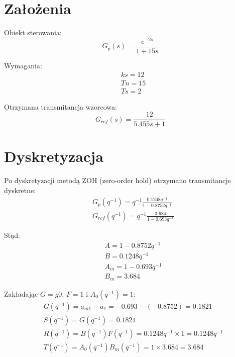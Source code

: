 \documentclass[fleqn]{article}
\newcommand \A {1 - 0.8752 q^{-1}}
\newcommand \B {0.1248 q^{-1}}
\newcommand \Am {1 - 0.693 q^{-1}}
\newcommand \Bm {3.684}
\newcommand \aOne {-0.8752}
\newcommand \amOne {-0.693}
\begin{document}
  
\section{Założenia}

Obiekt sterowania:
\begin{equation}\label{eq:Gp}
G_p(s) = \frac{e^{-2s}}{1 + 15s}
\end{equation}

Wymagania:
\begin{equation}\label{eq:wymagania}
\begin{split}
& ks = 12 \\
& Tn = 15 \\
& Ts = 2
\end{split}
\end{equation}

Otrzymana transmitancja wzorcowa:
\begin{equation}\label{eq:tr_ref}
G_{ref}(s) = \frac{12}{5.455s + 1}
\end{equation}

\section{Dyskretyzacja}
Po dyskretyzacji metodą ZOH (zero-order hold) otrzymano transmitancje dyskretne:
\begin{equation}\label{eq:G_d}
\begin{split}
& G_p(q^{-1}) = q^{-1}\frac{\B}{\A} \\
& G_{ref}(q^{-1}) = q^{-1}\frac{\Bm}{\Am}
\end{split}
\end{equation} %

Stąd:
\begin{equation}\label{eq:A_B_m}
\begin{split}
& A = \A \\
& B = \B \\
& A_m = \Am \\
& B_m = \Bm
\end{split}
\end{equation}

Zakładając $G = g0$, $F=1$ i $A_0(q^{-1})=1$:
\begin{equation}\label{eq:polynomials}
\begin{split}
& G(q^{-1}) = a_{m1} - a_1 = \amOne - (\aOne) = 0.1821 \\
& S(q^{-1}) = G(q^{-1}) = 0.1821 \\
& R(q^{-1}) = B(q^{-1})F(q^{-1}) = \B \times 1 = \B \\
& T(q^{-1}) = A_0(q^{-1})B_m(q^{-1}) = 1 \times \Bm = \Bm \\
\end{split}
\end{equation}
\end{document}
